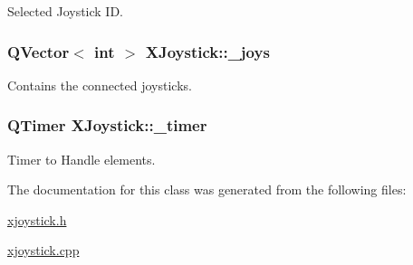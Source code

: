 Selected Joystick I\+D. 

\hypertarget{class_x_joystick_a50c3a87dac7c883a1865e5c2b4cdabfd}{}
\subsubsection[{\+\_\+joys}]{\setlength{\rightskip}{0pt plus 5cm}Q\+Vector$<$ int $>$ X\+Joystick\+::\+\_\+joys\hspace{0.3cm}{\ttfamily [private]}}\label{class_x_joystick_a50c3a87dac7c883a1865e5c2b4cdabfd}


Contains the connected joysticks. 

\hypertarget{class_x_joystick_ac2748a746ebdf779cf54fe761bfbfa0b}{}
\subsubsection[{\+\_\+timer}]{\setlength{\rightskip}{0pt plus 5cm}Q\+Timer X\+Joystick\+::\+\_\+timer\hspace{0.3cm}{\ttfamily [private]}}\label{class_x_joystick_ac2748a746ebdf779cf54fe761bfbfa0b}


Timer to Handle elements. 



The documentation for this class was generated from the following files\+:\begin{DoxyCompactItemize}
\item 
\hyperlink{xjoystick_8h}{xjoystick.\+h}\item 
\hyperlink{xjoystick_8cpp}{xjoystick.\+cpp}\end{DoxyCompactItemize}
